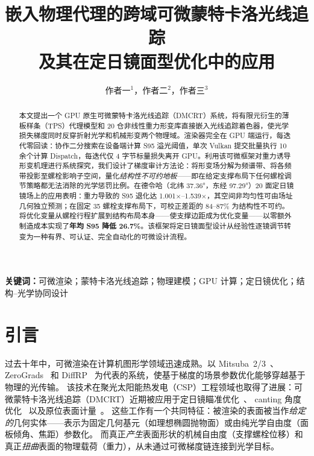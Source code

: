 \documentclass[12pt,a4paper]{ctexart}
\title{\textbf{嵌入物理代理的跨域可微蒙特卡洛光线追踪\\及其在定日镜面型优化中的应用}}
\author{作者一$^{1}$，作者二$^{2}$，作者三$^{3}$}
\date{}
\begin{document}
\maketitle

\begin{abstract}
本文提出一个 GPU 原生可微蒙特卡洛光线追踪（DMCRT）系统，将有限元衍生的薄板样条（TPS）代理模型和 20 仓非线性重力形变库直接嵌入光线追踪着色器，使光学损失梯度同时反穿折射光学和机械形变两个物理域。渲染器完全在 GPU 端运行，每迭代零回读：协作二分搜索在设备端计算 S95 溢光阈值，单次 Vulkan 提交批量执行 10 余个计算 Dispatch，每迭代仅 4 字节标量损失离开 GPU。利用该可微框架对重力诱导形变机理进行系统探究，我们设计了梯度审计方法论：将形变场分解为频谱带、将各频带投影至螺栓影响子空间，量化\emph{结构性不可约地板}——即在给定支撑布局下任何螺栓调节策略都无法消除的光学惩罚比例。在德令哈（北纬 37.36°，东经 97.29°）20 面定日镜镜场上的应用表明：重力导致的 S95 退化达 1.001$\times$--1.539$\times$，其空间非均匀性可由场址几何独立预测；在固定 35 螺栓支撑布局下，可校正差距的 84--87\% 为结构性不可约。将优化变量从螺栓行程扩展到结构布局本身——使支撑边距成为优化变量——以零额外制造成本实现了\textbf{年均 S95 降低 26.7\%}。该框架将定日镜面型设计从经验性逐镜调节转变为一种有界、可认证、完全自动化的可微设计流程。
\end{abstract}

\noindent\textbf{关键词：}可微渲染；蒙特卡洛光线追踪；物理建模；GPU 计算；定日镜优化；结构--光学协同设计

\section{引言}

过去十年中，可微渲染在计算机图形学领域迅速成熟。以 Mitsuba~2/3~\cite{mitsuba2,mitsuba3}、
ZeroGrads~\cite{zerograds} 和 DiffRP~\cite{diffrp} 为代表的系统，使基于梯度的场景参数优化能够穿越基于物理的光传输。
该技术在聚光太阳能热发电（CSP）工程领域也取得了进展：可微蒙特卡洛光线追踪（DMCRT）近期被应用于定日镜瞄准优化~\cite{aiming2025}、
canting 角度优化~\cite{canting2025} 以及原位表面计量~\cite{pargmann2024,inverse2025a,inverse2025b}。
这些工作有一个共同特征：被渲染的表面被当作\emph{给定的}几何实体——表示为固定几何基元（如理想椭圆抛物面）或由纯光学自由度（面板倾角、焦距）参数化。
而真正\emph{产生}表面形状的机械自由度（支撑螺栓位移）和真正\emph{扭曲}表面的物理载荷（重力），从未通过可微梯度链连接到光学目标。
\end{document}
